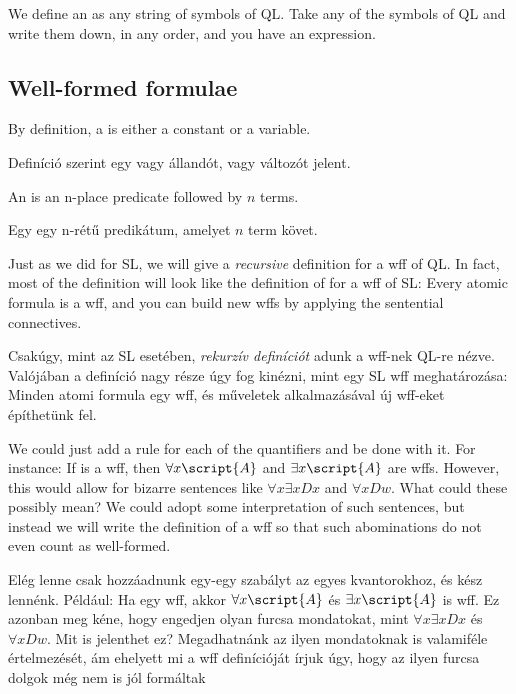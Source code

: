 We define an  as any string of symbols of QL. Take any of the symbols of QL and write them down, in any order, and you have an expression.


\subsection{Well-formed formulae}

By definition, a  is either a constant or a variable.

Definíció szerint egy  vagy állandót, vagy változót jelent.

An  is an n-place predicate followed by $n$ terms.

Egy  egy n-rétű predikátum, amelyet $n$ term követ.

Just as we did for SL, we will give a \emph{recursive} definition for a wff of QL. In fact, most of the definition will look like the definition of for a wff of SL: Every atomic formula is a wff, and you can build new wffs by applying the sentential connectives.

Csakúgy, mint az SL esetében, \emph{rekurzív definíciót} adunk a wff-nek QL-re nézve.
Valójában a definíció nagy része úgy fog kinézni, mint egy SL wff meghatározása: Minden
atomi formula egy wff, és műveletek alkalmazásával új wff-eket építhetünk fel.

We could just add a rule for each of the quantifiers and be done with it. For instance: If  is a wff, then $\forall x\script{A}$ and $\exists x\script{A}$ are wffs. However, this would allow for bizarre sentences like $\forall x\exists x Dx$ and $\forall x Dw$. What could these possibly mean? We could adopt some interpretation of such sentences, but instead we will write the definition of a wff so that such abominations do not even count as well-formed.

Elég lenne csak hozzáadnunk egy-egy szabályt az egyes kvantorokhoz, és kész lennénk. Például: Ha  egy wff, akkor $\forall x\script{A}$ és $\exists x\script{A}$ is wff. Ez azonban meg kéne, hogy engedjen olyan furcsa mondatokat, mint  $\forall x\exists x Dx$ és $\forall x Dw$. Mit is jelenthet ez? Megadhatnánk az ilyen mondatoknak is valamiféle értelmezését, ám ehelyett mi a wff definícióját írjuk úgy, hogy az ilyen furcsa dolgok még nem is jól formáltak

